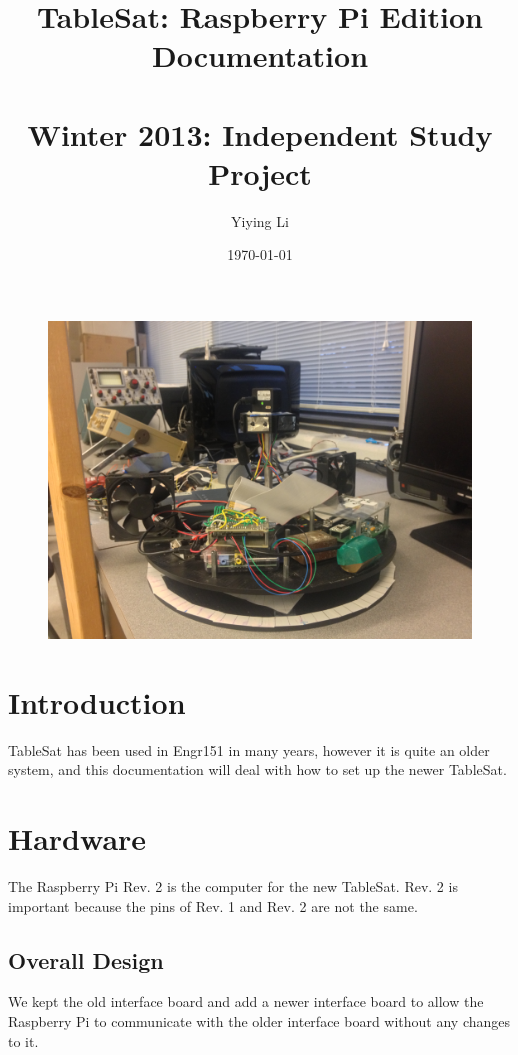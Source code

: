\documentclass{article}
\begin{document}
\title{TableSat: Raspberry Pi Edition Documentation \\ \hfill \\ \large Winter 2013: Independent Study Project}
\author{Yiying Li}
\date{\today}

\begin{figure}
\centering
\includegraphics[width=5in]{titlepage.JPG} 
\end{figure}
\maketitle
\thispagestyle{empty}
\pagebreak

\setcounter{page}{1}
\tableofcontents

\pagebreak
{}

\section{Introduction}
TableSat has been used in Engr151 in many years, however it is quite an older system, and this documentation will deal with how to set up the newer TableSat.
\section{Hardware}
The Raspberry Pi Rev. 2 is the computer for the new TableSat. Rev. 2 is important because the pins of Rev. 1 and Rev. 2 are not the same.
\subsection{Overall Design}
We kept the old interface board and add a newer interface board to allow the Raspberry Pi to communicate with the older interface board without any changes to it.
\end{document}
